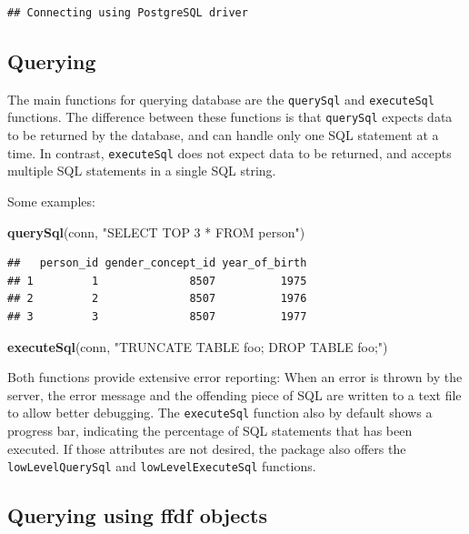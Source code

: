 \documentclass[11pt]{book}
\newenvironment{Shaded}{\begin{snugshade}}{\end{snugshade}}
\newcommand{\KeywordTok}[1]{\textcolor[rgb]{0.13,0.29,0.53}{\textbf{#1}}}
\newcommand{\NormalTok}[1]{#1}
\newcommand{\StringTok}[1]{\textcolor[rgb]{0.31,0.60,0.02}{#1}}
\theoremstyle{definition}
\theoremstyle{definition}
\theoremstyle{definition}
\theoremstyle{remark}
\begin{document}
\begin{verbatim}
## Connecting using PostgreSQL driver
\end{verbatim}

\hypertarget{querying}{%
\subsection{Querying}\label{querying}}

The main functions for querying database are the \texttt{querySql} and \texttt{executeSql} functions. The difference between these functions is that \texttt{querySql} expects data to be returned by the database, and can handle only one SQL statement at a time. In contrast, \texttt{executeSql} does not expect data to be returned, and accepts multiple SQL statements in a single SQL string. 

Some examples:

\begin{Shaded}
\begin{Highlighting}[]
\KeywordTok{querySql}\NormalTok{(conn, }\StringTok{"SELECT TOP 3 * FROM person"}\NormalTok{)}
\end{Highlighting}
\end{Shaded}

\begin{verbatim}
##   person_id gender_concept_id year_of_birth
## 1         1              8507          1975
## 2         2              8507          1976
## 3         3              8507          1977
\end{verbatim}

\begin{Shaded}
\begin{Highlighting}[]
\KeywordTok{executeSql}\NormalTok{(conn, }\StringTok{"TRUNCATE TABLE foo; DROP TABLE foo;"}\NormalTok{)}
\end{Highlighting}
\end{Shaded}

Both functions provide extensive error reporting: When an error is thrown by the server, the error message and the offending piece of SQL are written to a text file to allow better debugging. The \texttt{executeSql} function also by default shows a progress bar, indicating the percentage of SQL statements that has been executed. If those attributes are not desired, the package also offers the \texttt{lowLevelQuerySql} and \texttt{lowLevelExecuteSql} functions.

\hypertarget{querying-using-ffdf-objects}{%
\subsection{Querying using ffdf objects}\label{querying-using-ffdf-objects}}
\end{document}
